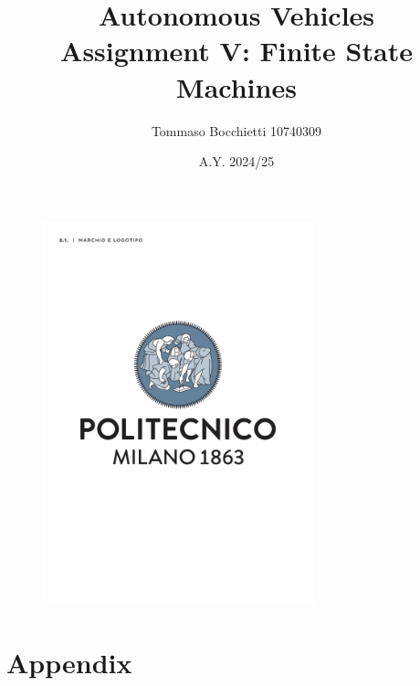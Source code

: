 \documentclass{assignment}
\begin{document}
\title{Autonomous Vehicles \\ Assignment V: Finite State Machines}
\author{Tommaso Bocchietti 10740309}
\date{A.Y. 2024/25}

\maketitle

\begin{figure}[H]
    \centering
    \includegraphics[width=0.7\textwidth]{./pdf/Polimi_logo_coverpage.pdf}
    \label{fig:Polimi_logo}
\end{figure}

\clearpage
\tableofcontents
\listoffigures

\clearpage





\vspace*{\fill}
\nocite{*}



\vspace*{\fill}
\appendix
\section{Appendix}
\end{document}
